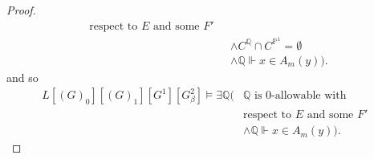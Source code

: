 \documentclass[a4paper,11pt]{article}
\newcommand{\forceP}{\mathbb{P}}
\newcommand{\forceQ}{\mathbb{Q}}
\begin{document}
\begin{proof}
\begin{align*}
\text{respect to } E \text{ and some $F'$ }  \\&  \land C^{\forceQ} \cap C^{\forceP^1}=\emptyset \\& \land
\forceQ \Vdash {x} \in A_m({y})).
\end{align*}
and so
\begin{align*}
L[(G)_0] [(G)_1] [G^1] [G^2_{\beta}] \models  \exists \forceQ (&\forceQ \text{ is } 0 \text{-allowable with} \\&
\text{respect to } E \text{ and some $F'$ }  \\&  \land
\forceQ \Vdash {x} \in A_m({y})).
\end{align*}






 
 




\end{proof}
\end{document}
